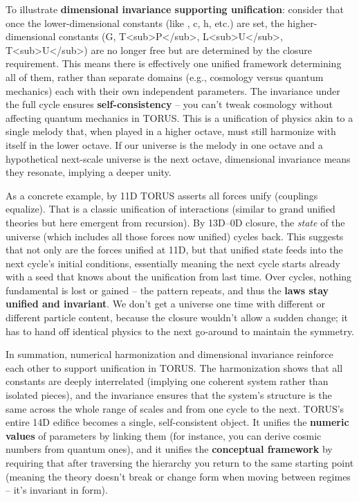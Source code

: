 \documentclass[
]{article}
\begin{document}
To illustrate \textbf{dimensional invariance supporting unification}:
consider that once the lower-dimensional constants (like \alpha, c, h, etc.)
are set, the higher-dimensional constants (G,
T\textless sub\textgreater P\textless/sub\textgreater,
L\textless sub\textgreater U\textless/sub\textgreater,
T\textless sub\textgreater U\textless/sub\textgreater) are no longer
free but are determined by the closure requirement\hspace{0pt}. This
means there is effectively one unified framework determining all of
them, rather than separate domains (e.g., cosmology versus quantum
mechanics) each with their own independent parameters. The invariance
under the full cycle ensures \textbf{self-consistency} -- you can't
tweak cosmology without affecting quantum mechanics in TORUS. This is a
unification of physics akin to a single melody that, when played in a
higher octave, must still harmonize with itself in the lower octave. If
our universe is the melody in one octave and a hypothetical next-scale
universe is the next octave, dimensional invariance means they resonate,
implying a deeper unity.

As a concrete example, by 11D TORUS asserts all forces unify (couplings
equalize)\hspace{0pt}. That is a classic unification of interactions
(similar to grand unified theories but here emergent from recursion). By
13D--0D closure, the \emph{state} of the universe (which includes all
those forces now unified) cycles back. This suggests that not only are
the forces unified at 11D, but that unified state feeds into the next
cycle's initial conditions, essentially meaning the next cycle starts
already with a seed that knows about the unification from last time.
Over cycles, nothing fundamental is lost or gained -- the pattern
repeats, and thus the \textbf{laws stay unified and invariant}. We don't
get a universe one time with different \alpha or different particle content,
because the closure wouldn't allow a sudden change; it has to hand off
identical physics to the next go-around to maintain the symmetry.

In summation, numerical harmonization and dimensional invariance
reinforce each other to support unification in TORUS. The harmonization
shows that all constants are deeply interrelated (implying one coherent
system rather than isolated pieces), and the invariance ensures that the
system's structure is the same across the whole range of scales and from
one cycle to the next. TORUS's entire 14D edifice becomes a single,
self-consistent object. It unifies the \textbf{numeric values} of
parameters by linking them (for instance, you can derive cosmic numbers
from quantum ones), and it unifies the \textbf{conceptual framework} by
requiring that after traversing the hierarchy you return to the same
starting point (meaning the theory doesn't break or change form when
moving between regimes -- it's invariant in form).
\end{document}
